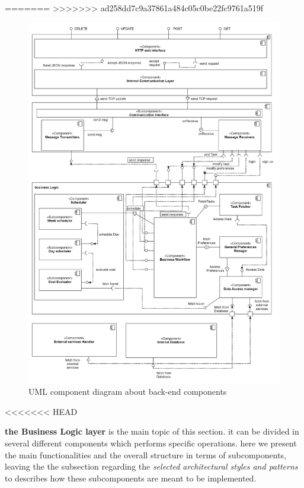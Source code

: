         
        \newpage
=======
\newpage
>>>>>>> ad258dd7c9a37861a484c05c0be22fc9761a519f
\begin{figure}[H]
    \centering
    \includegraphics[scale=0.2]{Pictures/ComponentDiagram/componentDiagram.png}
    \caption{UML component diagram about back-end components}
\end{figure}
<<<<<<< HEAD
\newpage

\textbf{the Business Logic layer} is the main topic of this section. it can be divided in several different components which performs specific operations. here we present the main functionalities and the overall structure in terms of subcomponents, leaving the the subsection regarding the \emph{selected architectural styles and patterns} to describes how these subcomponents are meant to be implemented.

